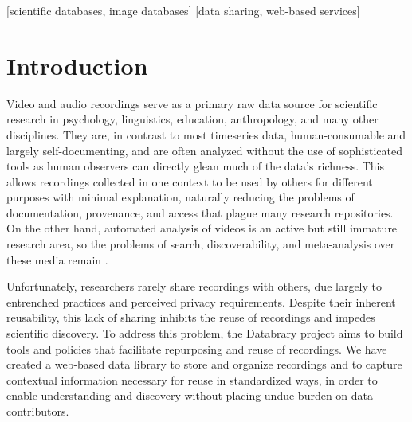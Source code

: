 \documentclass{sig-alternate}
\begin{document}
[scientific databases, image databases]
[data sharing, web-based services]



\section{Introduction}

Video and audio recordings serve as a primary raw data source for scientific research in psychology, linguistics, education, anthropology, and many other disciplines.
They are, in contrast to most timeseries data, human-consumable and largely self-documenting, and are often analyzed without the use of sophisticated tools as human observers can directly glean much of the data's richness.
This allows recordings collected in one context to be used by others for different purposes with minimal explanation, naturally reducing the problems of documentation, provenance, and access that plague many research repositories.
On the other hand, automated analysis of videos is an active but still immature research area, so the problems of search, discoverability, and meta-analysis over these media remain \cite{Albertson_2013, Lanagan_Smeaton_2012}.

Unfortunately, researchers rarely share recordings with others, due largely to entrenched practices and perceived privacy requirements.
Despite their inherent reusability, this lack of sharing inhibits the reuse of recordings and impedes scientific discovery.
To address this problem, the Databrary project aims to build tools and policies that facilitate repurposing and reuse of recordings.
We have created a web-based data library to store and organize recordings and to capture contextual information necessary for reuse in standardized ways, in order to enable understanding and discovery without placing undue burden on data contributors.
\end{document}
